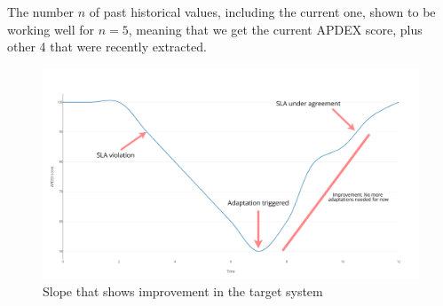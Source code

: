 \begin{appendices}
The number $n$ of past historical values, including the current one, shown to be working well for $n=5$, meaning that we get the current APDEX score, plus other 4 that were recently extracted.

\begin{figure}[t]
  \includegraphics[scale=0.3]{images/detectImprovement.png}
  \caption{Slope that shows improvement in the target system}
  \label{fig:finch3}
\end{figure}
\end{appendices}